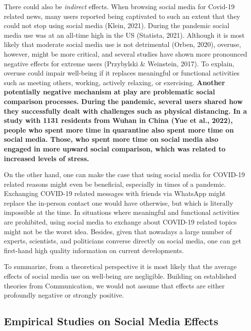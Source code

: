\documentclass[
  man,mask]{apa7}
\begin{document}
There could also be \emph{indirect} effects.
When browsing social media for Covid-19 related news, many users reported being captivated to such an extent that they could not stop using social media (Klein, 2021).
During the pandemic social media use was at an all-time high in the US (Statista, 2021).
Although it is most likely that moderate social media use is not detrimental (Orben, 2020), overuse, however, might be more critical, and several studies have shown more pronounced negative effects for extreme users (Przybylski \& Weinstein, 2017).
To explain, overuse could impair well-being if it replaces meaningful or functional activities such as meeting others, working, actively relaxing, or exercising.
\textbf{Another potentially negative mechanism at play are problematic social comparison processes. During the pandemic, several users shared how they successfully dealt with challenges such as physical distancing. In a study with 1131 residents from Wuhan in China (Yue et al., 2022), people who spent more time in quarantine also spent more time on social media. Those, who spent more time on social media also engaged in more upward social comparison, which was related to increased levels of stress.}

On the other hand, one can make the case that using social media for COVID-19 related reasons might even be beneficial, especially in times of a pandemic.
Exchanging COVID-19 related messages with friends via WhatsApp might replace the in-person contact one would have otherwise, but which is literally impossible at the time.
In situations where meaningful and functional activities are prohibited, using social media to exchange about COVID-19 related topics might not be the worst idea.
Besides, given that nowadays a large number of experts, scientists, and politicians converse directly on social media, one can get first-hand high quality information on current developments.

To summarize, from a theoretical perspective it is most likely that the average effects of social media use on well-being are negligible.
Building on established theories from Communication, we would not assume that effects are either profoundly negative or strongly positive.

\hypertarget{empirical-studies-on-social-media-effects}{%
\subsection{Empirical Studies on Social Media Effects}\label{empirical-studies-on-social-media-effects}}
\end{document}
